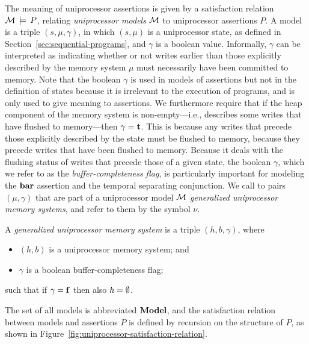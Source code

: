 \documentclass[11pt]{report}
\begin{document}
The meaning of uniprocessor assertions is given by a satisfaction relation $\mathcal{M} \,\models\, P$, relating \emph{uniprocessor models} $\mathcal{M}$ to uniprocessor assertions $P$. A model is a triple $(s,\mu,\gamma)$, in which $(s,\mu)$ is a uniprocessor state, as defined in Section~\ref{sec:sequential-programs}, and $\gamma$ is a boolean value. Informally, $\gamma$ can be interpreted as indicating whether or not writes earlier than those explicitly described by the memory system $\mu$ must necessarily have been committed to memory. Note that the boolean $\gamma$ is used in models of assertions but not in the definition of states because it is irrelevant to the execution of programs, and is only used to give meaning to assertions. We furthermore require that if the heap component of the memory system is non-empty---i.e., describes some writes that have flushed to memory---then $\gamma = \mathbf{t}$. This is because any writes that precede those explicitly described by the state must be flushed to memory, because they precede writes that have been flushed to memory. Because it deals with the flushing status of writes that precede those of a given state, the boolean $\gamma$, which we refer to as the \emph{buffer-completeness flag}, is particularly important for modeling the $\mathbf{bar}$ assertion and the temporal separating conjunction. We call to pairs $(\mu,\gamma)$ that are part of a uniprocessor model $\mathcal{M}$ \emph{generalized uniprocessor memory systems}, and refer to them by the symbol $\nu$.

\begin{definition}
  A \emph{generalized uniprocessor memory system} is a triple $(h, b, \gamma)$, where \begin{itemize}
    \item $(h,b)$ is a uniprocessor memory system; and
    \item $\gamma$ is a boolean buffer-completeness flag; 
  \end{itemize} such that if $\gamma = \mathbf{f}$ then also $h = \operatorname{\emptyset}$. 
\end{definition} 

The set of all models is abbreviated $\mathbf{Model}$, and the satisfaction relation between models and assertions $P$ is defined by recursion on the structure of $P$, as shown in Figure~\ref{fig:uniprocessor-satisfaction-relation}. 
\end{document}

